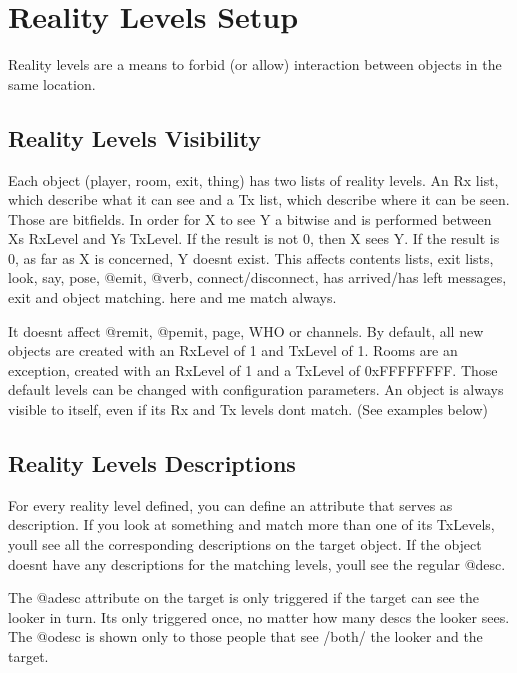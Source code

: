 \documentclass[letterpaper,10pt,english]{sphinxmanual}
\begin{document}
\section{Reality Levels Setup}
\label{\detokenize{advanced:reality-levels-setup}}
\sphinxAtStartPar
Reality levels are a means to forbid (or allow) interaction between objects
in the same location.


\subsection{Reality Levels Visibility}
\label{\detokenize{advanced:reality-levels-visibility}}
\sphinxAtStartPar
Each object (player, room, exit, thing) has two lists of reality levels.
An Rx list, which describe what it can see and a Tx list, which describe
where it can be seen. Those are bitfields. In order for X to see Y a bitwise
\textquotesingle{}and\textquotesingle{} is performed between X\textquotesingle{}s RxLevel and Y\textquotesingle{}s TxLevel. If the result is not
0, then X sees Y. If the result is 0, as far as X is concerned, Y doesn\textquotesingle{}t
exist. This affects contents lists, exit lists, look, say, pose, @emit,
@verb, connect/disconnect, has arrived/has left messages, exit and object
matching. \textquotesingle{}here\textquotesingle{} and \textquotesingle{}me\textquotesingle{} match always.

\sphinxAtStartPar
It doesn\textquotesingle{}t affect @remit, @pemit, page, WHO or channels.
By default, all new objects are created with an RxLevel of 1 and TxLevel of
1. Rooms are an exception, created with an RxLevel of 1 and a TxLevel of
0xFFFFFFFF. Those default levels can be changed with configuration
parameters.
An object is always visible to itself, even if its Rx and Tx levels don\textquotesingle{}t
match. (See examples below)


\subsection{Reality Levels Descriptions}
\label{\detokenize{advanced:reality-levels-descriptions}}
\sphinxAtStartPar
For every reality level defined, you can define an attribute that serves as
description. If you look at something and match more than one of its
TxLevels, you\textquotesingle{}ll see all the corresponding descriptions on the target
object. If the object doesn\textquotesingle{}t have any descriptions for the matching levels,
you\textquotesingle{}ll see the regular @desc.

\sphinxAtStartPar
The @adesc attribute on the target is only triggered if the target can see
the looker in turn. It\textquotesingle{}s only triggered once, no matter how many descs the
looker sees. The @odesc is shown only to those people that see /both/ the
looker and the target.
\end{document}
